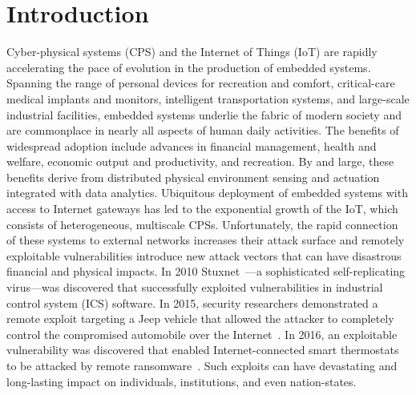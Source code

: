 \chapter{Introduction}\label{chapter:introduction}

\par Cyber-physical systems (CPS) and the Internet of Things (IoT) are rapidly accelerating the pace of evolution in the production of embedded systems. Spanning the range of personal devices for recreation and comfort, critical-care medical implants and monitors, intelligent transportation systems, and large-scale industrial facilities, embedded systems underlie the fabric of modern society and are commonplace in nearly all aspects of human daily activities. The benefits of widespread adoption include advances in financial management, health and welfare, economic output and productivity, and recreation. By and large, these benefits derive from distributed physical environment sensing and actuation integrated with data analytics. %
%
Ubiquitous deployment of embedded systems with access to Internet gateways has led to the exponential growth of the IoT, which consists of heterogeneous, multiscale CPSs. Unfortunately, the rapid connection of these systems to external networks increases their attack surface and remotely exploitable vulnerabilities introduce new attack vectors that can have disastrous financial and physical impacts. In 2010 Stuxnet~\cite{stuxnet}---a sophisticated self-replicating virus---was discovered that successfully exploited vulnerabilities in industrial control system (ICS) software. In 2015, security researchers demonstrated a remote exploit targeting a Jeep vehicle that allowed the attacker to completely control the compromised automobile over the Internet~\cite{jeep_vulnerability}. In 2016, an exploitable vulnerability was discovered that enabled Internet-connected smart thermostats to be attacked by remote ransomware~\cite{smart_thermostat}. Such exploits can have devastating and long-lasting impact on individuals, institutions, and even nation-states.

